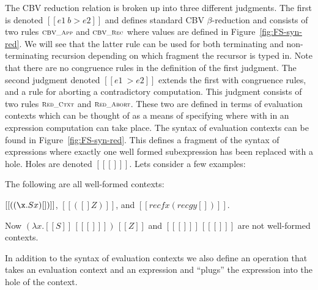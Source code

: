 The CBV reduction relation is broken up into three different
judgments.  The first is denoted $[[e1 ~b> e2]]$ and defines standard
CBV $\beta$-reduction and consists of two rules
$\textsc{\scriptsize CBV\_App}$ and $\textsc{\scriptsize CBV\_Rec}$ where values are
defined in Figure~\ref{fig:FS-syn-red}.  We will see that the latter rule
can be used for both terminating and non-terminating recursion
depending on which fragment the recursor is typed in.  Note that there
are no congruence rules in the definition of the first judgment.  The
second judgment denoted $[[e1 ~> e2]]$ extends the first with
congruence rules, and a rule for aborting a contradictory computation.
This judgment consists of two rules $\textsc{\scriptsize Red\_Ctxt}$ and
$\textsc{\scriptsize Red\_Abort}$.  These two are defined in terms of
evaluation contexts which can be thought of as a means of specifying
where with in an expression computation can take place. The syntax of
evaluation contexts can be found in Figure~\ref{fig:FS-syn-red}.  This
defines a fragment of the syntax of expressions where exactly one well
formed subexpression has been replaced with a hole.  Holes are denoted
$[[ [] ]]$. Lets consider a few examples:
\begin{example}
  \label{ex:FS-WF-ECTX}
  The following are all well-formed contexts:
  \begin{center}
    $[[((\x.S x) []) ]]$, $[[ ([] Z)]]$, and $[[rec f x (rec g y [])]]$.
  \end{center}
  Now $(\lambda x.[[S]]\,[[ [] ]])\,[[Z]]$ and $[[ [] ]]\,[[ [] ]]$
  are not well-formed contexts.
\end{example}
\noindent
In addition to the syntax of evaluation contexts we also define an
operation that takes an evaluation context and an expression and
``plugs'' the expression into the hole of the context.  

